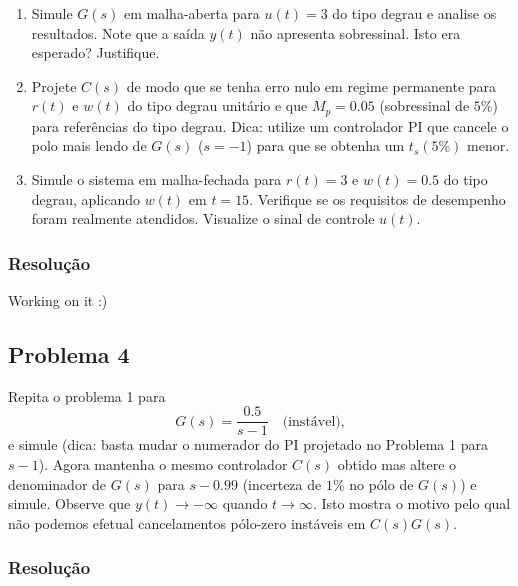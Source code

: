 \documentclass[
]{book}
\providecommand{\tightlist}{%
  \setlength{\itemsep}{0pt}\setlength{\parskip}{0pt}}
\begin{document}
\begin{enumerate}
\def\labelenumi{(\alph{enumi})}
\tightlist
\item
  Simule \(G(s)\) em malha-aberta para \(u(t) =3\) do tipo degrau e analise os resultados. Note que a saída \(y(t)\) não apresenta sobressinal. Isto era esperado? Justifique.
\item
  Projete \(C(s)\) de modo que se tenha erro nulo em regime permanente para \(r(t)\) e \(w(t)\) do tipo degrau unitário e que \(M_p=0.05\) (sobressinal de \(5\%\)) para referências do tipo degrau. Dica: utilize um controlador PI que cancele o polo mais lendo de \(G(s)\) (\(s=-1\)) para que se obtenha um \(t_s(5\%)\) menor.
\item
  Simule o sistema em malha-fechada para \(r(t) = 3\) e \(w(t) = 0.5\) do tipo degrau, aplicando \(w(t)\) em \(t=15\). Verifique se os requisitos de desempenho foram realmente atendidos. Visualize o sinal de controle \(u(t)\).
\end{enumerate}

\hypertarget{resoluuxe7uxe3o-2}{%
\subsubsection*{Resolução}\label{resoluuxe7uxe3o-2}}

Working on it :)

\hypertarget{problema-4}{%
\subsection*{Problema 4}\label{problema-4}}

Repita o problema 1 para
\[
G(s) = \frac{0.5}{s-1} \quad \text{(instável),}
\]
e simule (dica: basta mudar o numerador do PI projetado no Problema 1 para \(s-1\)). Agora mantenha o mesmo controlador \(C(s)\) obtido mas altere o denominador de \(G(s)\) para \(s-0.99\) (incerteza de \(1\%\) no pólo de \(G(s)\)) e simule. Observe que \(y(t) \to -\infty\) quando \(t\to\infty\). Isto mostra o motivo pelo qual não podemos efetual cancelamentos pólo-zero instáveis em \(C(s)G(s)\).

\hypertarget{resoluuxe7uxe3o-3}{%
\subsubsection*{Resolução}\label{resoluuxe7uxe3o-3}}
\end{document}
